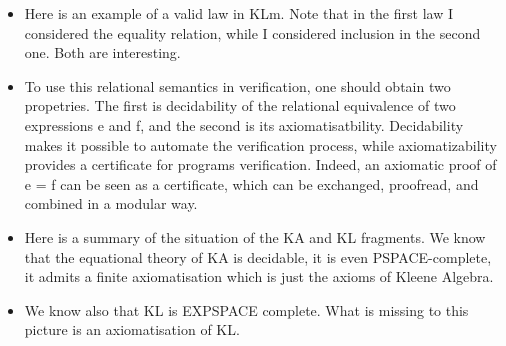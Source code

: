\documentclass{article}
\begin{document}
\begin{itemize}
\item Here is an example of a valid law in KLm. Note that in the first law I considered the equality relation, while I considered inclusion in the second one. Both are interesting.
  
\item To use this relational semantics in verification, one should obtain two propetries. The first is decidability of the relational equivalence of two expressions e and f, and the second is its axiomatisatbility. Decidability makes it possible to automate the verification process, while axiomatizability provides a certificate for programs
verification. Indeed, an axiomatic proof of e = f can be seen as a certificate, which can
be exchanged, proofread, and combined in a modular way. 

\item Here is a summary of the situation of the KA and KL fragments. We know that the equational theory of KA is decidable, it is even PSPACE-complete,  it admits a finite axiomatisation which is just the axioms of Kleene Algebra.

\item We know also that KL is EXPSPACE complete.  
What is missing to this picture is an axiomatisation of KL. 

\end{itemize}
\end{document}
